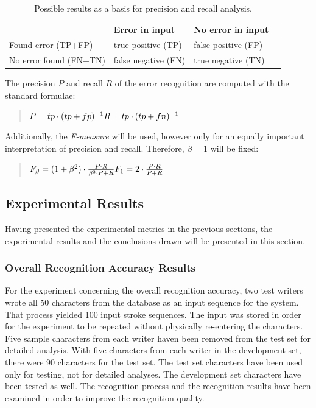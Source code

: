 \begin{table}[htbp]
\begin{center}
  \begin{tabular}{|l|l|l|p{200pt}|}
    \hline
                           & Error in input      & No error in input \\
    \hline
    Found error (TP+FP)    & true positive (TP)  & false positive (FP) \\
    \hline
    No error found (FN+TN) & false negative (FN) & true negative (TN) \\
    \hline
  \end{tabular}
\end{center}
\caption{Possible results as a basis for precision and recall analysis.}
\label{table:eval:resultsforprecisionandrecall}
\end{table}
The precision \(P\) and recall \(R\) of the error recognition are computed 
with the standard formulae:
\begin{quote}
\(
P=tp \cdot (tp+fp)^{-1} \\
R=tp \cdot (tp+fn)^{-1} \\
\)  
\end{quote}
Additionally, the \emph{F-measure} will be used, however only for an equally 
important interpretation of precision and recall. Therefore, \(\beta = 1\) will
be fixed:
\begin{quote}
\(
F_{\beta} = (1 + \beta^2) \cdot \frac{P \cdot R }{ \beta^2 \cdot P + R} \\
F_{1} = 2 \cdot \frac{P \cdot R }{P + R} \\
\)
\end{quote}

\subsection{Experimental Results}
\label{sec:eval:experimentalresults}

Having presented the experimental metrics in the previous sections, 
the experimental results and the conclusions drawn will be presented in this 
section.

\subsubsection{Overall Recognition Accuracy Results}
\label{sec:eval:resultsoverallrecognition}

For the experiment concerning the overall recognition accuracy, two test writers 
wrote all 50 characters from the database as an input sequence for the system.
That process yielded 100 input stroke sequences.
The input was stored in order for the experiment to be repeated without
physically re-entering the characters. Five sample characters from each 
writer haven been removed from the test set for detailed analysis.
With five characters from each writer in the development set, there were 
90 characters for the test set.
The test set characters have been used only for testing, not for 
detailed analyses. The development set characters have been tested as well.
The recognition process and the recognition results have been 
examined in order to improve the recognition quality.

